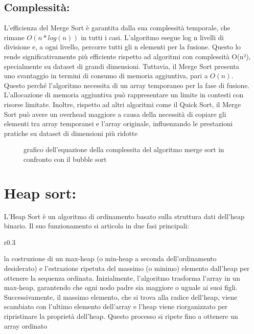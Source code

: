 \documentclass[a4paper]{article}
\begin{document}
\subsection{Complessità:}
L'efficienza del Merge Sort è garantita dalla sua complessità temporale, che rimane \(O(n*log(n))\) in tutti i casi. L’algoritmo esegue log n livelli di divisione e,
a ogni livello, percorre tutti gli n elementi per la fusione. Questo lo rende significativamente più efficiente rispetto ad algoritmi con complessità O(n²), 
specialmente su dataset di grandi dimensioni.
Tuttavia, il Merge Sort presenta uno svantaggio in termini di consumo di memoria aggiuntiva, pari a \(O(n)\). Questo perché l’algoritmo necessita di un array 
temporaneo per la fase di fusione. L’allocazione di memoria aggiuntiva può rappresentare un limite in contesti con risorse limitate. Inoltre, rispetto ad 
altri algoritmi come il Quick Sort, il Merge Sort può avere un overhead maggiore a causa della necessità di copiare gli elementi tra array temporanei e l’array 
originale, influenzando le prestazioni pratiche su dataset di dimensioni più ridotte
\begin{figure}[h]
    \caption{grafico dell'equazione della complessita del algoritmo merge sort in confronto con il bubble sort}
\end{figure}
\section{Heap sort:}
L’Heap Sort è un algoritmo di ordinamento basato sulla struttura dati dell’heap binario. Il suo funzionamento si articola in due fasi principali: 
\begin{wrapfigure}{r}{0.3\textwidth}
        \begin{center}
        \end{center}
\end{wrapfigure}
la costruzione di un max-heap (o min-heap a seconda dell’ordinamento desiderato) e l’estrazione ripetuta del massimo (o minimo) elemento dall’heap per
ottenere la sequenza ordinata. Inizialmente, l’algoritmo trasforma l’array in un max-heap, garantendo che ogni nodo padre sia maggiore o uguale ai suoi 
figli. Successivamente, il massimo elemento, che si trova alla radice dell’heap, viene scambiato con l’ultimo elemento dell’array e l’heap viene riorganizzato
per ripristinare la proprietà dell’heap. Questo processo si ripete fino a ottenere un array ordinato
\end{document}
